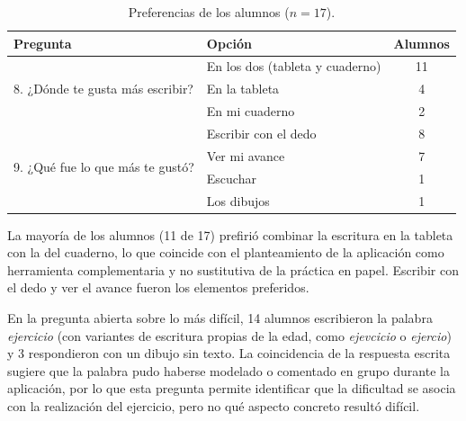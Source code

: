 \begin{table}[H]
\centering
\caption{Preferencias de los alumnos ($n=17$).}
\label{tab:preferencias-alumnos}
\renewcommand{\arraystretch}{1.3}
\begin{tabular}{|p{5.2cm}|p{5.2cm}|c|}
\hline
\textbf{Pregunta} & \textbf{Opción} & \textbf{Alumnos} \\ \hline
\multirow{3}{=}{8. ¿Dónde te gusta más escribir?} & En los dos (tableta y cuaderno) & 11 \\ \cline{2-3}
 & En la tableta & 4 \\ \cline{2-3}
 & En mi cuaderno & 2 \\ \hline
\multirow{4}{=}{9. ¿Qué fue lo que más te gustó?} & Escribir con el dedo & 8 \\ \cline{2-3}
 & Ver mi avance & 7 \\ \cline{2-3}
 & Escuchar & 1 \\ \cline{2-3}
 & Los dibujos & 1 \\ \hline
\end{tabular}
\end{table}

La mayoría de los alumnos (11 de 17) prefirió combinar la escritura en la tableta con la del cuaderno, lo que coincide con el planteamiento de la aplicación como herramienta complementaria y no sustitutiva de la práctica en papel. Escribir con el dedo y ver el avance fueron los elementos preferidos.

En la pregunta abierta sobre lo más difícil, 14 alumnos escribieron la palabra \textit{ejercicio} (con variantes de escritura propias de la edad, como \textit{ejevcicio} o \textit{ejercio}) y 3 respondieron con un dibujo sin texto. La coincidencia de la respuesta escrita sugiere que la palabra pudo haberse modelado o comentado en grupo durante la aplicación, por lo que esta pregunta permite identificar que la dificultad se asocia con la realización del ejercicio, pero no qué aspecto concreto resultó difícil.
